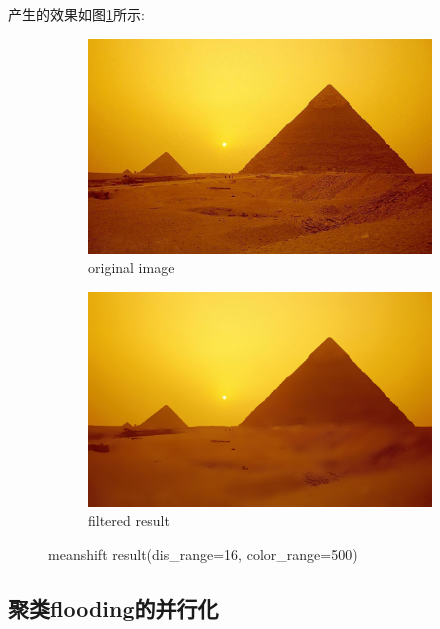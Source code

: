 \documentclass[a4paper, 11pt]{article}
\begin{document}
产生的效果如图\ref{fig:cuda_ms_1}所示:

\begin{figure}[H]
	\centering
	\begin{subfigure}[b]{0.4\textwidth}
		\includegraphics[width=\textwidth]{images/cuda_ms/1_org}
		\caption{original image}
	\end{subfigure}
	\hspace{5mm} 
	\begin{subfigure}[b]{0.4\textwidth}
		\includegraphics[width=\textwidth]{images/cuda_ms/1_res}
		\caption{filtered result}
	\end{subfigure}
	\caption{meanshift result(dis\_range=16, color\_range=500)}
	\label{fig:cuda_ms_1}
\end{figure}

\subsection{聚类flooding的并行化}
\end{document}
